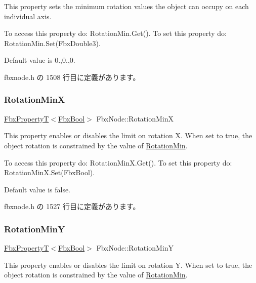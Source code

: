 This property sets the minimum rotation values the object can occupy on each individual axis.

To access this property do\+: Rotation\+Min.\+Get(). To set this property do\+: Rotation\+Min.\+Set(\+Fbx\+Double3).

Default value is 0.,0.,0. 

 fbxnode.\+h の 1508 行目に定義があります。

\mbox{\label{class_fbx_node_a8b07f4e0bae14c76b79405c0f881a492}} 
\subsubsection{\texorpdfstring{Rotation\+MinX}{RotationMinX}}
{\footnotesize\ttfamily \hyperlink{class_fbx_property_t}{Fbx\+PropertyT}$<$\hyperlink{fbxtypes_8h_a92e0562b2fe33e76a242f498b362262e}{Fbx\+Bool}$>$ Fbx\+Node\+::\+Rotation\+MinX}

This property enables or disables the limit on rotation X. When set to {\ttfamily true}, the object rotation is constrained by the value of \hyperlink{class_fbx_node_a186dc96c347a68ff32eb1641f02c70c8}{Rotation\+Min}.

To access this property do\+: Rotation\+Min\+X.\+Get(). To set this property do\+: Rotation\+Min\+X.\+Set(\+Fbx\+Bool).

Default value is false. 

 fbxnode.\+h の 1527 行目に定義があります。

\mbox{\label{class_fbx_node_aa1e032cbdaad4bac9ef9dbc6efe3fcea}} 
\subsubsection{\texorpdfstring{Rotation\+MinY}{RotationMinY}}
{\footnotesize\ttfamily \hyperlink{class_fbx_property_t}{Fbx\+PropertyT}$<$\hyperlink{fbxtypes_8h_a92e0562b2fe33e76a242f498b362262e}{Fbx\+Bool}$>$ Fbx\+Node\+::\+Rotation\+MinY}

This property enables or disables the limit on rotation Y. When set to {\ttfamily true}, the object rotation is constrained by the value of \hyperlink{class_fbx_node_a186dc96c347a68ff32eb1641f02c70c8}{Rotation\+Min}.

